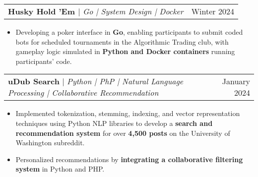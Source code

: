 \documentclass[letterpaper,11pt]{article}
\makeatletter
\newcommand{\resumeItem}[1]{
  \item\small{
    {#1 \vspace{-2pt}}
  }
}
\newcommand{\resumeProjectHeading}[2]{
    \item
    \begin{tabular*}{0.97\textwidth}{l@{\extracolsep{\fill}}r}
      \small#1 & #2 \\
    \end{tabular*}\vspace{-7pt}
}
\newcommand{\resumeItemListStart}{\begin{itemize}}
\newcommand{\resumeItemListEnd}{\end{itemize}\vspace{-5pt}}
\makeatother
\begin{document}




\resumeProjectHeading
{\textbf{\textcolor{DarkOrchid4}{Husky Hold 'Em }} $|$ \emph{Go | System Design | Docker}}{Winter 2024}
\resumeItemListStart
\resumeItem{Developing a poker interface in \textbf{Go}, enabling participants to submit coded bots for scheduled tournaments in the Algorithmic Trading club, with gameplay logic simulated in \textbf{Python and Docker containers }running participants' code.}
\resumeItemListEnd

\resumeProjectHeading
{\textbf{\textcolor{DodgerBlue4}{uDub Search}} $|$ \emph{Python | PhP | Natural Language Processing | Collaborative Recommendation}}{January 2024}
\resumeItemListStart
\resumeItem{Implemented tokenization, stemming, indexing, and vector representation techniques using Python NLP libraries to develop a \textbf{search and recommendation system} for over \textbf{4,500 posts }on the University of Washington subreddit.}
\resumeItem{Personalized recommendations by \textbf{integrating a collaborative filtering system} in Python and PHP.}
\resumeItemListEnd


\end{document}
